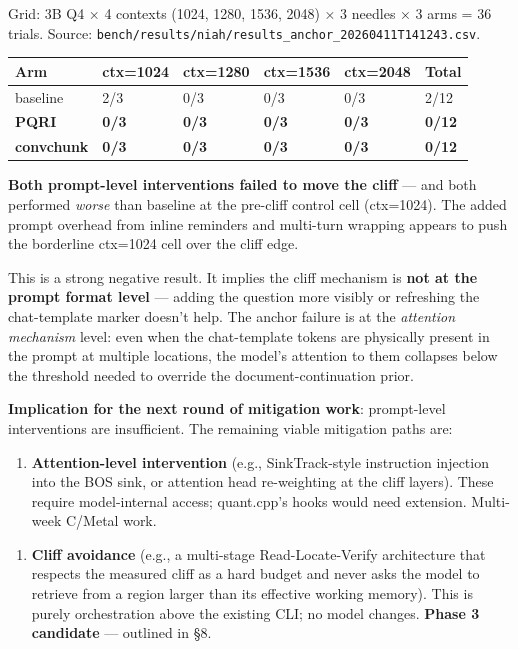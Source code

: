 \documentclass[11pt]{article}
\begin{document}
Grid: 3B Q4 × 4 contexts (1024, 1280, 1536, 2048) × 3 needles × 3 arms = 36 trials. Source: \texttt{bench/results/niah/results\_anchor\_20260411T141243.csv}.


\begin{center}
\begin{tabular}{llllll}
\toprule
Arm & ctx=1024 & ctx=1280 & ctx=1536 & ctx=2048 & Total \\
\midrule
baseline & 2/3 & 0/3 & 0/3 & 0/3 & 2/12 \\
\textbf{PQRI} & \textbf{0/3} & \textbf{0/3} & \textbf{0/3} & \textbf{0/3} & \textbf{0/12} \\
\textbf{convchunk} & \textbf{0/3} & \textbf{0/3} & \textbf{0/3} & \textbf{0/3} & \textbf{0/12} \\
\bottomrule
\end{tabular}
\end{center}


\textbf{Both prompt-level interventions failed to move the cliff} — and both performed \textit{worse} than baseline at the pre-cliff control cell (ctx=1024). The added prompt overhead from inline reminders and multi-turn wrapping appears to push the borderline ctx=1024 cell over the cliff edge.


This is a strong negative result. It implies the cliff mechanism is \textbf{not at the prompt format level} — adding the question more visibly or refreshing the chat-template marker doesn't help. The anchor failure is at the \textit{attention mechanism} level: even when the chat-template tokens are physically present in the prompt at multiple locations, the model's attention to them collapses below the threshold needed to override the document-continuation prior.


\textbf{Implication for the next round of mitigation work}: prompt-level interventions are insufficient. The remaining viable mitigation paths are:


\begin{enumerate}
\item \textbf{Attention-level intervention} (e.g., SinkTrack-style instruction injection into the BOS sink, or attention head re-weighting at the cliff layers). These require model-internal access; quant.cpp's hooks would need extension. Multi-week C/Metal work.
\end{enumerate}


\begin{enumerate}
\item \textbf{Cliff avoidance} (e.g., a multi-stage Read-Locate-Verify architecture that respects the measured cliff as a hard budget and never asks the model to retrieve from a region larger than its effective working memory). This is purely orchestration above the existing CLI; no model changes. \textbf{Phase 3 candidate} — outlined in §8.
\end{enumerate}
\end{document}
